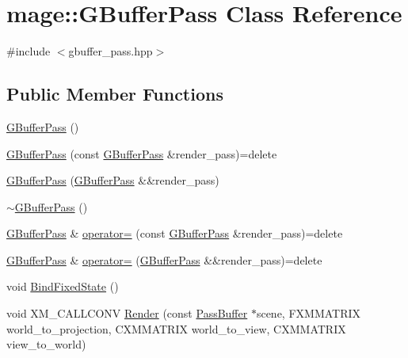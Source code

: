\hypertarget{classmage_1_1_g_buffer_pass}{}\section{mage\+:\+:G\+Buffer\+Pass Class Reference}
\label{classmage_1_1_g_buffer_pass}


{\ttfamily \#include $<$gbuffer\+\_\+pass.\+hpp$>$}

\subsection*{Public Member Functions}
\begin{DoxyCompactItemize}
\item 
\hyperlink{classmage_1_1_g_buffer_pass_afe455d4051cddf84b7752b4bf4aa282f}{G\+Buffer\+Pass} ()
\item 
\hyperlink{classmage_1_1_g_buffer_pass_a3b9f59097aef9175f942c9c9424d0dab}{G\+Buffer\+Pass} (const \hyperlink{classmage_1_1_g_buffer_pass}{G\+Buffer\+Pass} \&render\+\_\+pass)=delete
\item 
\hyperlink{classmage_1_1_g_buffer_pass_a61a520a53c7a8029280eb1fc62d71ce6}{G\+Buffer\+Pass} (\hyperlink{classmage_1_1_g_buffer_pass}{G\+Buffer\+Pass} \&\&render\+\_\+pass)
\item 
\hyperlink{classmage_1_1_g_buffer_pass_a34b2735cfb9b3546c903760f42ff770c}{$\sim$\+G\+Buffer\+Pass} ()
\item 
\hyperlink{classmage_1_1_g_buffer_pass}{G\+Buffer\+Pass} \& \hyperlink{classmage_1_1_g_buffer_pass_a79468fb8b4547197315c0aabbabffa71}{operator=} (const \hyperlink{classmage_1_1_g_buffer_pass}{G\+Buffer\+Pass} \&render\+\_\+pass)=delete
\item 
\hyperlink{classmage_1_1_g_buffer_pass}{G\+Buffer\+Pass} \& \hyperlink{classmage_1_1_g_buffer_pass_ace14aafdd028f12296b3fabf1e36ca02}{operator=} (\hyperlink{classmage_1_1_g_buffer_pass}{G\+Buffer\+Pass} \&\&render\+\_\+pass)=delete
\item 
void \hyperlink{classmage_1_1_g_buffer_pass_a4a13364cc0318417f31df50d7081b0b0}{Bind\+Fixed\+State} ()
\item 
void X\+M\+\_\+\+C\+A\+L\+L\+C\+O\+NV \hyperlink{classmage_1_1_g_buffer_pass_a67b030c2efe8daa5aad105307fa09887}{Render} (const \hyperlink{structmage_1_1_pass_buffer}{Pass\+Buffer} $\ast$scene, F\+X\+M\+M\+A\+T\+R\+IX world\+\_\+to\+\_\+projection, C\+X\+M\+M\+A\+T\+R\+IX world\+\_\+to\+\_\+view, C\+X\+M\+M\+A\+T\+R\+IX view\+\_\+to\+\_\+world)
\end{DoxyCompactItemize}
